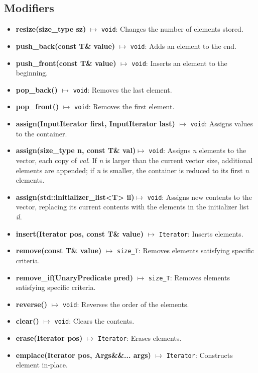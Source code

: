 \documentclass{report}
\begin{document}
    \subsection{Modifiers}
    \begin{itemize}
        \item \textbf{resize(size\_type sz)} $\mapsto$ \texttt{void}: Changes the number of elements stored.
        \item \textbf{push\_back(const T\& value)} $\mapsto$ \texttt{void}: Adds an element to the end.
        \item \textbf{push\_front(const T\& value)} $\mapsto$ \texttt{void}: Inserts an element to the beginning.
        \item \textbf{pop\_back()} $\mapsto$ \texttt{void}: Removes the last element.
        \item \textbf{pop\_front()} $\mapsto$ \texttt{void}: Removes the first element.
        \item \textbf{assign(InputIterator first, InputIterator last)} $\mapsto$ \texttt{void}: Assigns values to the container.
        \item \textbf{assign(size\_type n, const T\& val)}$\mapsto$ \texttt{void}: Assigns \textit{n} elements to the vector, each copy of \textit{val}. If \textit{n} is larger than the current vector size, additional elements are appended; if \textit{n} is smaller, the container is reduced to its first \textit{n} elements.
        \item \textbf{assign(std::initializer\_list<T> il)}$\mapsto$ \texttt{void}: Assigns new contents to the vector, replacing its current contents with the elements in the initializer list \textit{il}.
        \item \textbf{insert(Iterator pos, const T\& value)} $\mapsto$ \texttt{Iterator}: Inserts elements.
        \item \textbf{remove(const T\& value)} $\mapsto$ \texttt{size\_T}: Removes elements satisfying specific criteria.
        \item \textbf{remove\_if(UnaryPredicate pred)} $\mapsto$ \texttt{size\_T}: Removes elements satisfying specific criteria.
        \item \textbf{reverse()} $\mapsto$ \texttt{void}: Reverses the order of the elements.
        \item \textbf{clear()} $\mapsto$ \texttt{void}: Clears the contents.
        \item \textbf{erase(Iterator pos)} $\mapsto$ \texttt{Iterator}: Erases elements.
        \item \textbf{emplace(Iterator pos, Args\&\&... args)} $\mapsto$ \texttt{Iterator}: Constructs element in-place.

\end{itemize}
\end{document}

